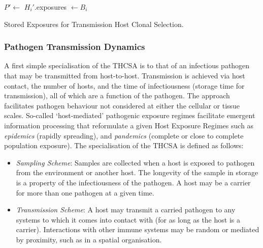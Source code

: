 \begin{algorithm}[htp]
  \SetLine  
  
  \KwIn{\Env, \Pop}		  
	
	{
		$P\prime \leftarrow$ \SelectHostsToExpose{\Pop}\;
		{
			\;
			$H_{i}\prime$.exposures $\leftarrow B_i$\;
		}		
	}
	\caption{Stored Exposures for Transmission Host Clonal Selection.}
	\label{alg:hosts:algorithms:thcsa:sample}
\end{algorithm}


%
%
\subsubsection{Pathogen Transmission Dynamics}
A first simple specialisation of the THCSA is to that of an infectious pathogen that may be transmitted from host-to-host. Transmission is achieved via host contact, the number of hosts, and the time of infectiousness (storage time for transmission), all of which are a function of the pathogen. The approach facilitates pathogen behaviour not considered at either the cellular or tissue scales. So-called `host-mediated' pathogenic exposure regimes facilitate emergent information processing that reformulate a given Host Exposure Regimes such as \emph{epidemics} (rapidly spreading), and \emph{pandemics} (complete or close to complete population exposure). The specialisation of the THCSA is defined as follows:

\begin{itemize}
	\item \emph{Sampling Scheme}: Samples are collected when a host is exposed to pathogen from the environment or another host. The longevity of the sample in storage is a property of the infectiousness of the pathogen. A host may be a carrier for more than one pathogen at a given time.
	\item \emph{Transmission Scheme}: A host may transmit a carried pathogen to any systems to which it comes into contact with (for as long as the host is a carrier). Interactions with other immune systems may be random or mediated by proximity, such as in a spatial organisation.
\end{itemize}

